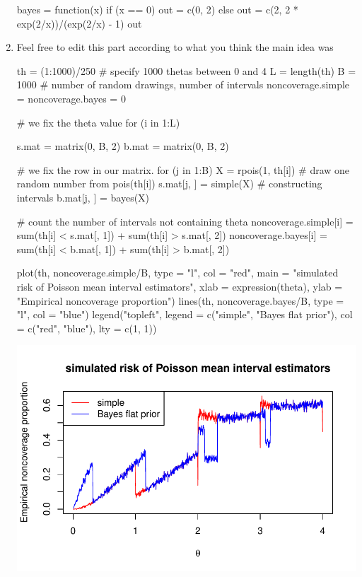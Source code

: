 \documentclass[12pt, a4paper]{article}\usepackage[]{graphicx}\usepackage[]{color}
\makeatletter
\def\maxwidth{ %
  \ifdim\Gin@nat@width>\linewidth
    \linewidth
  \else
    \Gin@nat@width
  \fi
}
\makeatother
\begin{document}
\begin{enumerate}[label={\bfseries\arabic*.}]
\begin{Schunk}
\begin{Sinput}
bayes = function(x) {
    if (x == 0) {
        out = c(0, 2)
    } else {
        out = c(2, 2 * exp(2/x))/(exp(2/x) - 1)
    }
    out
}
\end{Sinput}
\end{Schunk}

\item Feel free to edit this part according to what you think the main idea was

\begin{Schunk}
\begin{Sinput}
th = (1:1000)/250  # specify 1000 thetas between 0 and 4
L = length(th)
B = 1000  # number of random drawings, number of intervals
noncoverage.simple = noncoverage.bayes = 0

# we fix the theta value
for (i in 1:L) {
    s.mat = matrix(0, B, 2)
    b.mat = matrix(0, B, 2)

    # we fix the row in our matrix.
    for (j in 1:B) {
        X = rpois(1, th[i])  # draw one random number from pois(th[i])
        s.mat[j, ] = simple(X)  # constructing intervals
        b.mat[j, ] = bayes(X)
    }

    # count the number of intervals not containing theta
    noncoverage.simple[i] = sum(th[i] < s.mat[, 1]) + sum(th[i] > s.mat[, 2])
    noncoverage.bayes[i] = sum(th[i] < b.mat[, 1]) + sum(th[i] > b.mat[, 2])
}

plot(th, noncoverage.simple/B, type = "l", col = "red", main = "simulated risk of Poisson mean interval estimators",
    xlab = expression(theta), ylab = "Empirical noncoverage proportion")
lines(th, noncoverage.bayes/B, type = "l", col = "blue")
legend("topleft", legend = c("simple", "Bayes flat prior"), col = c("red", "blue"), lty = c(1, 1))
\end{Sinput}


{\centering \includegraphics[width=\maxwidth]{figure/unnamed-chunk-4-1} 

}
\end{Schunk}
\end{enumerate}
\end{document}
